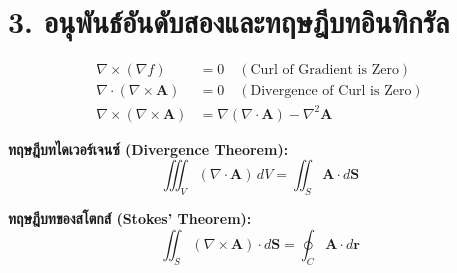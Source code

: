 \vspace{0.2cm}
\section*{3. อนุพันธ์อันดับสองและทฤษฎีบทอินทิกรัล}
\begin{align}
\nabla \times (\nabla f) &= 0 \quad (\text{Curl of Gradient is Zero}) \\
\nabla \cdot (\nabla \times \mathbf{A}) &= 0 \quad (\text{Divergence of Curl is Zero}) \\
\nabla \times (\nabla \times \mathbf{A}) &= \nabla(\nabla \cdot \mathbf{A}) - \nabla^2 \mathbf{A}
\end{align}

\vspace{0.2cm}
\noindent\textbf{ทฤษฎีบทไดเวอร์เจนซ์ (Divergence Theorem):}
\begin{equation}
\iiint_V (\nabla \cdot \mathbf{A}) \, dV = \iint_S \mathbf{A} \cdot d\mathbf{S}
\end{equation}

\vspace{0.2cm}
\noindent\textbf{ทฤษฎีบทของสโตกส์ (Stokes' Theorem):}
\begin{equation}
\iint_S (\nabla \times \mathbf{A}) \cdot d\mathbf{S} = \oint_C \mathbf{A} \cdot d\mathbf{r}
\end{equation}
